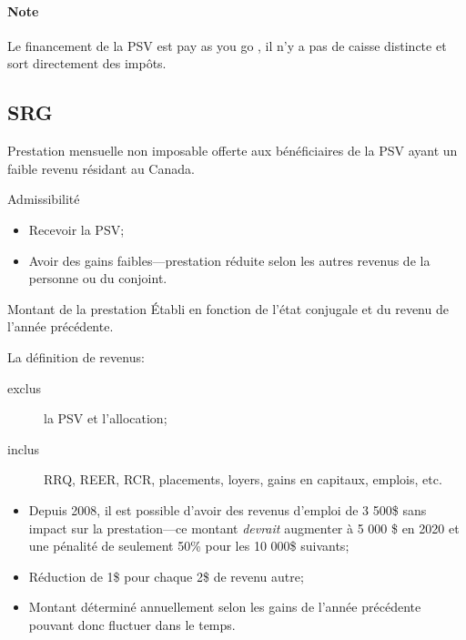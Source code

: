 \documentclass[10pt, french]{article}
\begin{document}
\begin{multicols*}{3}
\paragraph{Note}	Le financement de la PSV est \og pay as you go \fg{}, il n'y a pas de caisse distincte et sort directement des impôts.

\subsection{SRG}
\begin{definitionNOHFILL}[Définition]
Prestation mensuelle non imposable offerte aux bénéficiaires de la PSV ayant un faible revenu résidant au Canada.
\end{definitionNOHFILL}

\begin{conceptgen}{Admissibilité}
\begin{itemize}[leftmargin = *]
	\item	Recevoir la PSV;
	\item	Avoir des gains faibles---prestation réduite selon les autres revenus de la personne ou du conjoint.
\end{itemize}
\end{conceptgen}

\begin{conceptgen}{Montant de la prestation}
Établi en fonction de l'état conjugale et du revenu de l'année précédente.

La définition de revenus:
\begin{description}
	\item[exclus]	la PSV et l'allocation;
	\item[inclus]	RRQ, REER, RCR, placements, loyers, gains en capitaux, emplois, etc.
\end{description}

\begin{itemize}[leftmargin = *]
	\item	Depuis 2008, il est possible d'avoir des revenus d'emploi de 3 500\$ sans impact sur la prestation---ce montant \textit{devrait} augmenter à 5 000 \$ en 2020 et une pénalité de seulement 50\% pour les 10 000\$ suivants;
	\item	Réduction de 1\$ pour chaque 2\$ de revenu autre;
	\item	Montant déterminé annuellement selon les gains de l'année précédente pouvant donc fluctuer dans le temps.
\end{itemize}
\end{conceptgen}


\end{multicols*}
\end{document}
